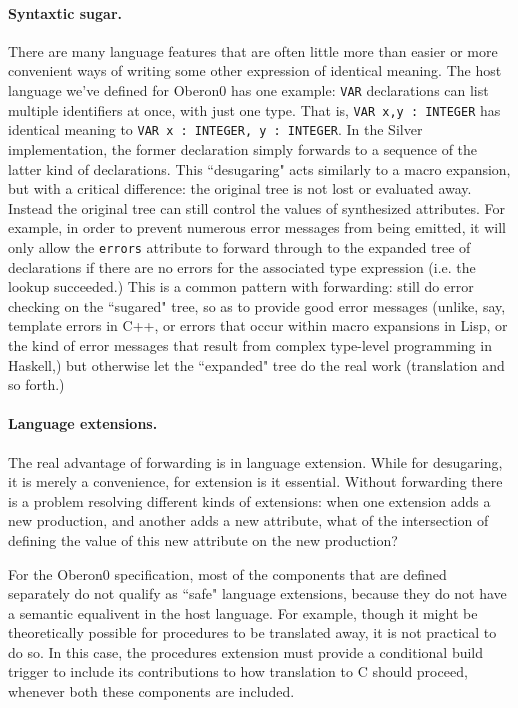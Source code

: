 \paragraph{Syntaxtic sugar.}
There are many language features that are often little more than easier or
more convenient ways of writing some other expression of identical meaning.
%
The host language we've defined for Oberon0 has one example: \texttt{VAR}
declarations can list multiple identifiers at once, with just one type.
%
That is, \texttt{VAR x,y : INTEGER} has identical meaning to
\texttt{VAR x : INTEGER, y : INTEGER}.
%
In the Silver implementation, the former declaration simply forwards to a sequence
of the latter kind of declarations.
%
This ``desugaring" acts similarly to a macro expansion, but with a critical
difference: the original tree is not lost or evaluated away.
%
Instead the original tree can still control the values of synthesized attributes.
%
For example, in order to prevent numerous error messages from being emitted,
it will only allow the \texttt{errors} attribute to forward through to the
expanded tree of declarations if there are no errors for the associated
type expression (i.e. the lookup succeeded.)
%
This is a common pattern with forwarding: still do error checking on the
``sugared" tree, so as to provide good error messages (unlike, say, template
errors in C++, or errors that occur within macro expansions in Lisp, or
the kind of error messages that result from complex type-level programming
in Haskell,) but otherwise let the ``expanded" tree do the real work (translation
and so forth.)

\paragraph{Language extensions.}
The real advantage of forwarding is in language extension.
%
While for desugaring, it is merely a convenience, for extension is it essential.
%
Without forwarding there is a problem resolving different kinds of extensions:
when one extension adds a new production, and another adds a new attribute,
what of the intersection of defining the value of this new attribute on the
new production?

For the Oberon0 specification, most of the components that are defined separately do
not qualify as ``safe" language extensions, because they do not have a
semantic equalivent in the host language.
%
For example, though it might be theoretically possible for procedures to
be translated away, it is not practical to do so.
%
In this case, the procedures extension must provide a conditional build trigger
to include its contributions to how translation to C should proceed, whenever both
these components are included.

